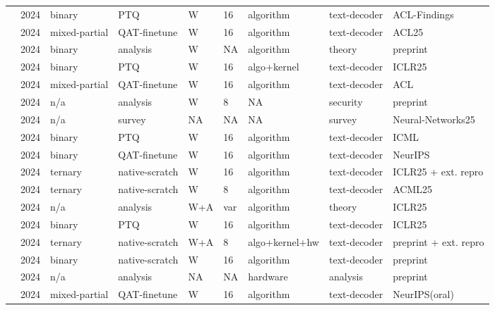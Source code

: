 \begin{landscape}
\begin{longtable}{p{3.2cm} p{1cm} p{1.9cm} p{2.2cm} p{2.2cm} p{1.3cm} p{2.2cm} p{2.1cm} p{2.5cm}}
\citet{Chen2024-DBLLM} & 2024 & binary & PTQ & W & 16 & algorithm & text-decoder & ACL-Findings \\
\citet{Chen2024-EfficientQAT} & 2024 & mixed-partial & QAT-finetune & W & 16 & algorithm & text-decoder & ACL25 \\
\citet{Daliri2024-Theory1bit} & 2024 & binary & analysis & W & NA & algorithm & theory & preprint \\
\citet{Dong2024-STBLLM} & 2024 & binary & PTQ & W & 16 & algo+\allowbreak{}kernel & text-decoder & ICLR25 \\
\citet{Du2024-BitDistiller} & 2024 & mixed-partial & QAT-finetune & W & 16 & algorithm & text-decoder & ACL \\
\citet{Das2024-GenBFA} & 2024 & n/\allowbreak{}a & analysis & W & 8 & NA & security & preprint \\
\citet{Gong2024-SurveyLowbit} & 2024 & n/\allowbreak{}a & survey & NA & NA & NA & survey & Neural-Networks25 \\
\citet{Huang2024-BiLLM} & 2024 & binary & PTQ & W & 16 & algorithm & text-decoder & ICML \\
\citet{Jo2024-BinaryMoS} & 2024 & binary & QAT-finetune & W & 16 & algorithm & text-decoder & Neur\allowbreak{}IPS \\
\citet{Kaushal2024-Spectra} & 2024 & ternary & native-scratch & W & 16 & algorithm & text-decoder & ICLR25 +\allowbreak{} ext. repro \\
\citet{Zhao2024-DQT} & 2024 & ternary & native-scratch & W & 8 & algorithm & text-decoder & ACML25 \\
\citet{Kumar2024-ScalingLawsPrecision} & 2024 & n/\allowbreak{}a & analysis & W+\allowbreak{}A & var & algorithm & theory & ICLR25 \\
\citet{Li2024-ARBLLM} & 2024 & binary & PTQ & W & 16 & algorithm & text-decoder & ICLR25 \\
\citet{Ma2024-BitNetB158} & 2024 & ternary & native-scratch & W+\allowbreak{}A & 8 & algo+\allowbreak{}kernel+\allowbreak{}hw & text-decoder & preprint +\allowbreak{} ext. repro \\
\citet{Ma2024-FBILLM} & 2024 & binary & native-scratch & W & 16 & algorithm & text-decoder & preprint \\
\citet{Malekar2024-MatmulOrNot} & 2024 & n/\allowbreak{}a & analysis & NA & NA & hardware & analysis & preprint \\
\citet{Malinovskii2024-PVTuning} & 2024 & mixed-partial & QAT-finetune & W & 16 & algorithm & text-decoder & Neur\allowbreak{}IPS(oral) \\

\end{longtable}
\end{landscape}
